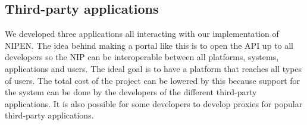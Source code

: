 \subsection{Third-party applications}

We developed three applications all interacting with our implementation of NIPEN. 
The idea behind making a portal like this is to open the API up to all developers so the NIP can be interoperable between all platforms, systems, applications and users. 
The ideal goal is to have a platform that reaches all types of users. 
The total cost of the project can be lowered by this because support for the system can be done by the developers of the different third-party applications. 
It is also possible for some developers to develop proxies for popular third-party applications.
\fi




\iffalse
We are glad we managed to implement every requirement 
meaning we made a realistic assumptions of what we could accomplish in the given time with the members we had.
This project is an interesting idea and finding a way to unify the collection of health data of citizens will lead to a better understanding of citizen health and to an \iffalse easier\fi overview of what can be improved for a better quality of life. 
\fi